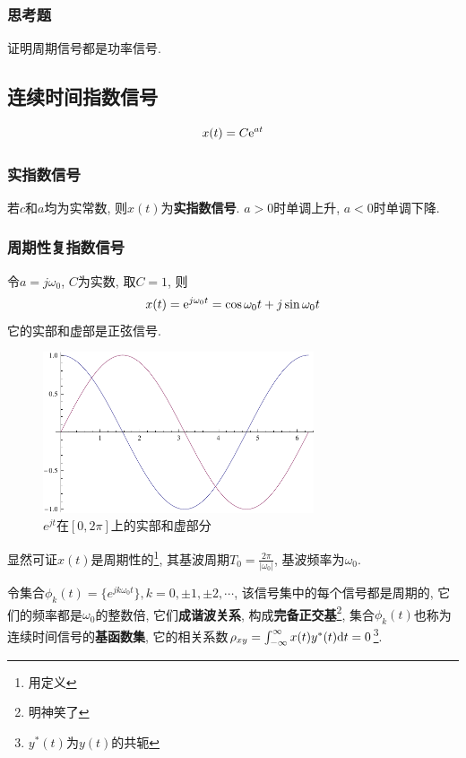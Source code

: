         \subsubsection{思考题}
        
            证明周期信号都是功率信号.

    \subsection{连续时间指数信号}

        \[x(t)=C\mathrm{e}^{at}\]

        \subsubsection{实指数信号}

            若$c$和$a$均为实常数, 则$x(t)$为\textbf{实指数信号}. $a>0$时单调上升, $a<0$时单调下降.

        \subsubsection{周期性复指数信号}

            令$a=j\omega_0$, $C$为实数, 取$C=1$, 则
            \[x(t)=\mathrm{e}^{j\omega_0t}=\cos\omega_0t+j\sin\omega_0t\]
            它的实部和虚部是正弦信号.

            \begin{figure}[h]\centering
                \includegraphics[width=8cm]{signals_chaps/lect2_inc/euler.pdf}
                \caption{$e^{jt}$在$[0, 2\pi]$上的实部和虚部分}
                \label{fig:2:euler}
            \end{figure}

            显然可证$x(t)$是周期性的\footnote{用定义}, 其基波周期$T_0=\frac{2\pi}{|\omega_0|}$, 基波频率为$\omega_0$.

            令集合$\phi_k(t)=\{e^{jk\omega_0t}\}, k=0, \pm1, \pm2, \cdots$, 该信号集中的每个信号都是周期的, 它们的频率都是$\omega_0$的整数倍, 它们\textbf{成谐波关系}, 构成\textbf{完备正交基}\footnote{明神笑了}, 集合$\phi_k(t)$也称为连续时间信号的\textbf{基函数集}, 它的相关系数$\rho_{xy}=\int_{-\infty}^{\infty}x(t)y^*(t)\mathrm{d} t=0$\footnote{$y^*(t)$为$y(t)$的共轭}.

